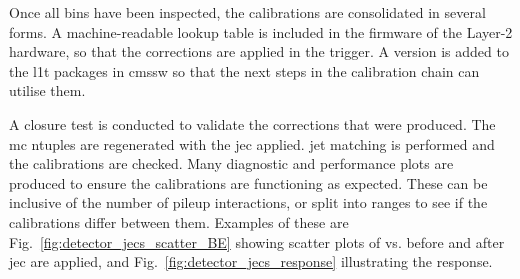 Once all \abseta bins have been inspected, the calibrations are consolidated in several forms. A machine-readable lookup table is included in the firmware of the Layer-2 hardware, so that the corrections are applied in the trigger. A version is added to the \acrlong{l1t} packages in \acrshort{cmssw} so that the next steps in the calibration chain can utilise them.

A closure test is conducted to validate the corrections that were produced. The \acrshort{mc} ntuples are regenerated with the \acrshort{jec} applied. \Gls{jet} matching is performed and the calibrations are checked. Many diagnostic and performance plots are produced to ensure the calibrations are functioning as expected. These can be inclusive of the number of \gls{pileup} interactions, or split into ranges to see if the calibrations differ between them. Examples of these are Fig.~\ref{fig:detector_jecs_scatter_BE} showing scatter plots of \ptRef vs. \ptLOne before and after \acrshort{jec} are applied, and Fig.~\ref{fig:detector_jecs_response} illustrating the response.


